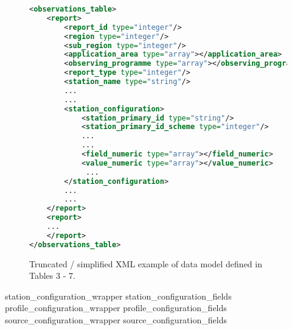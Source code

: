 \documentclass[a4paper]{article}
\newcounter{FramedDepth}
\newenvironment{Framed}{%
  \addtocounter{FramedDepth}{1}
  \ifcase\theFramedDepth\def\FrameColour{white!50}%
    \or\def\FrameColour{white!50}%
    \or\def\FrameColour{white!50}%
    \or\def\FrameColour{white!50}%
    \fi%
  \begin{mdframed}[style=Framed,backgroundcolor=\FrameColour]%
}{\end{mdframed}\addtocounter{FramedDepth}{-1}}
\begin{document}
\begin{figure}
\begin{Framed}
\begin{lstlisting}[language=XML]
<observations_table>
    <report>
        <report_id type="integer"/>
        <region type="integer"/>
        <sub_region type="integer"/>
        <application_area type="array"></application_area>
        <observing_programme type="array"></observing_programme>
        <report_type type="integer"/>
        <station_name type="string"/>
        ...
        ...
        <station_configuration>
            <station_primary_id type="string"/>
            <station_primary_id_scheme type="integer"/>
            ...
            ...
            <field_numeric type="array"></field_numeric>
            <value_numeric type="array"></value_numeric>
             ...
        </station_configuration>
        ...
        ...
    </report>
    <report>
    ...
    </report>
</observations_table>
\end{lstlisting}
\end{Framed}
\caption{Truncated / simplified XML example of data model defined in Tables 3 - 7.}
\end{figure}
\FloatBarrier







 {station_configuration_wrapper}
 {station_configuration_fields}
 {profile_configuration_wrapper}
 {profile_configuration_fields}
 {source_configuration_wrapper}
 {source_configuration_fields}
\end{document}

